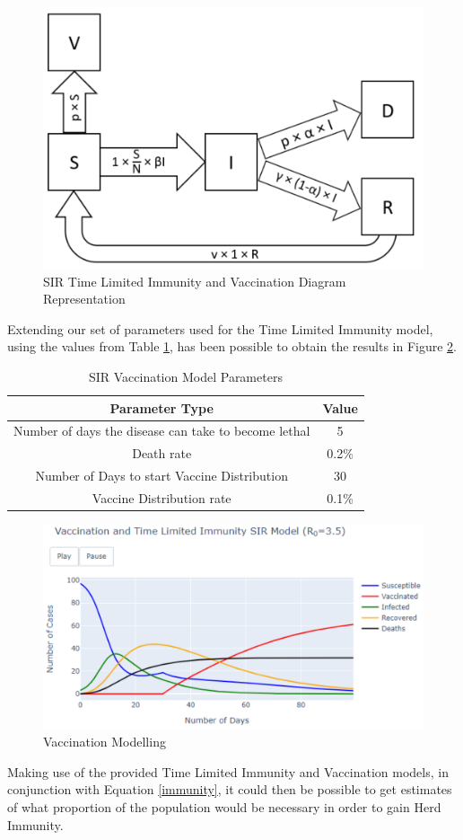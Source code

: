 \begin{figure}[ht!]%
    \centering
    \includegraphics[width=0.8\linewidth]{latex/images/dvacc.pdf}
    \caption{SIR Time Limited Immunity and Vaccination Diagram Representation}
    \label{dvacc}
\end{figure}


Extending our set of parameters used for the Time Limited Immunity model, using the values from Table \ref{table:2}, has been possible to obtain the results in Figure \ref{vacc}.

{
\begin{table}[h!]
\centering
\begin{tabular}{|c|c|}
\hline
Parameter Type & Value \\
\hline
Number of days the disease can take to become lethal & 5  \\
Death rate & 0.2\%  \\
Number of Days to start Vaccine Distribution & 30  \\
Vaccine Distribution rate & 0.1\%  \\
\hline
\end{tabular}
\caption{SIR Vaccination Model Parameters}
\label{table:2}
\end{table}
}

\begin{figure}[ht!]%
    \centering
    \includegraphics[width=0.85\linewidth]{latex/images/vacc.pdf}
    \vspace{-0.2cm}
    \caption{Vaccination Modelling}
    \label{vacc}
\end{figure}
\vspace{-0.5cm}
Making use of the provided Time Limited Immunity and Vaccination models, in conjunction with Equation \ref{immunity}, it could then be possible to get estimates of what proportion of the population would be necessary in order to gain Herd Immunity. 

